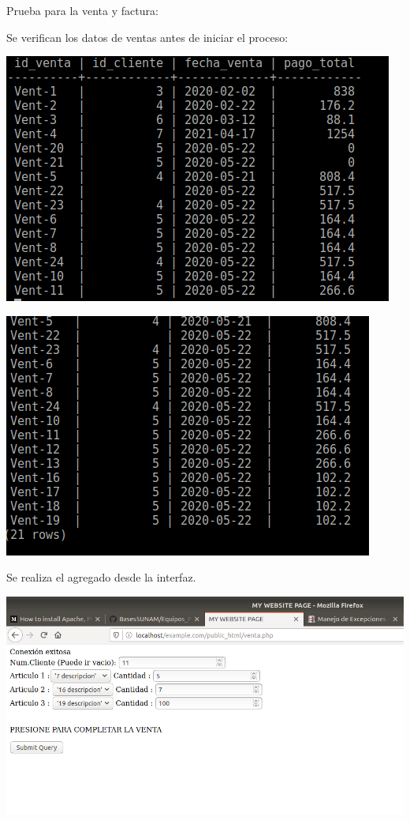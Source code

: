 \documentclass[12pt, letterpaper]{article}     %
\begin{document}
		Prueba para la venta y factura:
		
		Se verifican los datos de ventas antes de iniciar el proceso:
				
		
		\begin{center}
 	  	\includegraphics[scale=0.5]{web_venta_prev_1}
		\end{center}
		
		\begin{center}
 	  	\includegraphics[scale=0.5]{web_venta_prev_2}
		\end{center}
		
		Se realiza el agregado desde la interfaz.
		
		\begin{center}
 	  	\includegraphics[scale=0.5]{web_venta_agregar}
		\end{center}
		
\end{document}
